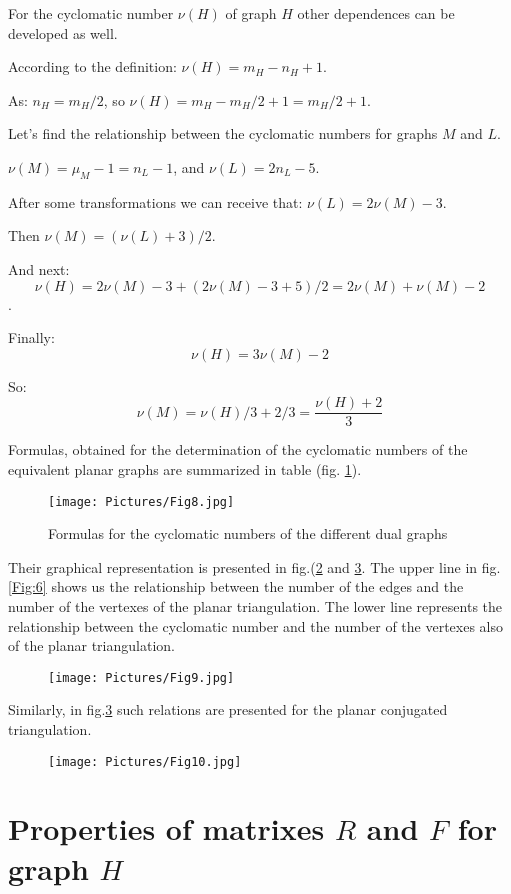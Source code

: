 \documentclass{amsart}
\theoremstyle{plain}
\numberwithin{equation}{section}
\begin{document}
For the cyclomatic number $\nu(H)$ of graph $H$ other dependences can be developed as well.

According to the definition: $\nu(H)=m_H-n_H+1$. 

As: $n_H=m_H/2$, so $\nu(H)=m_H-m_H/2+1=m_H/2+1$.

Let's find the relationship between the cyclomatic numbers for graphs $M$ and $L$.

$\nu(M)=\mu_M-1=n_L-1$, and $\nu(L)=2n_L-5$.
 
After some transformations we can receive that: $\nu(L)=2\nu(M)-3$.

Then $\nu(M)=(\nu(L)+3)/2$. 

And next: 
$$\nu(H)=2\nu(M)-3+(2\nu(M)-3+5)/2=2\nu(M)+\nu(M)-2$$.

Finally: 
$$\nu(H)=3\nu(M)-2$$ 

So: 
$$\nu(M)=\nu(H)/3+2/3=\frac{\nu(H)+2}{3}$$

Formulas, obtained for the determination of the cyclomatic numbers of the equivalent planar graphs are summarized in table (fig. \ref{Fig:8}). 

\begin{figure}[htb]
	\texttt{[image: Pictures/Fig8.jpg]}
  \caption{Formulas for the cyclomatic numbers of the different dual graphs}
	\label{Fig:8}
\end{figure}

Their graphical representation is presented in fig.(\ref{Fig:9} and \ref{Fig:10}. The upper line in fig.\ref{Fig:6} shows us the relationship between the number of the edges and the number of the vertexes of the planar triangulation. The lower line represents the relationship between the cyclomatic number and the number of the vertexes also of the planar triangulation. 

\begin{figure}[htb]
		\texttt{[image: Pictures/Fig9.jpg]}
	\caption{}
	\label{Fig:9}
\end{figure}

Similarly, in fig.\ref{Fig:10} such relations are presented for the planar conjugated triangulation. 


\begin{figure}[h]
		\texttt{[image: Pictures/Fig10.jpg]}
	\caption{}
	\label{Fig:10}
\end{figure}

\section{Properties of matrixes $R$ and $F$ for graph $H$}
\end{document}
